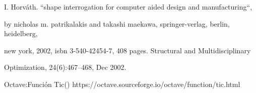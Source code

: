 \documentclass[a4paper,portrait,12pt]{article}
\begin{document}
\begin{flushleft}
[1] I. Horváth. {``}shape interrogation for computer aided design and manufacturing{``},
\end{flushleft}


\begin{flushleft}
by nicholas m. patrikalakis and takashi maekawa, springer-verlag, berlin, heidelberg,
\end{flushleft}


\begin{flushleft}
new york, 2002, isbn 3-540-42454-7, 408 pages. Structural and Multidisciplinary
\end{flushleft}


\begin{flushleft}
Optimization, 24(6):467--468, Dec 2002.
\end{flushleft}





\begin{flushleft}
Octave:Función Tic() https://octave.sourceforge.io/octave/function/tic.html
\end{flushleft}





\newpage
\end{document}
